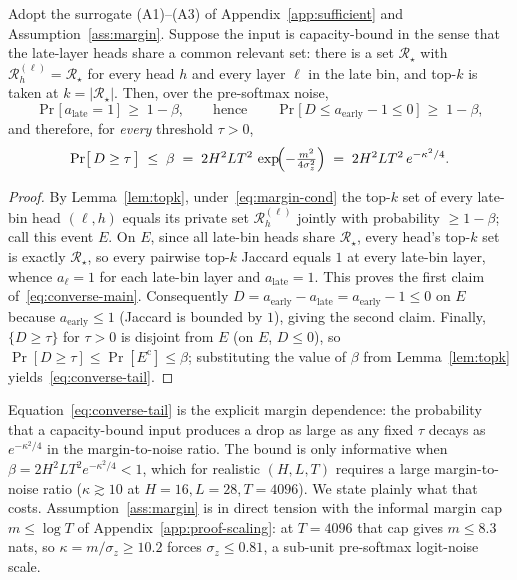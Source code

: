 \begin{theorem}
\label{thm:converse}
Adopt the surrogate (A1)--(A3) of Appendix~\ref{app:sufficient} and
Assumption~\ref{ass:margin}. Suppose the input is capacity-bound in the sense
that the late-layer heads share a common relevant set: there is a set
$\mathcal{R}_\star$ with $\mathcal{R}^{(\ell)}_h=\mathcal{R}_\star$ for every
head $h$ and every layer $\ell$ in the late bin, and top-$k$ is taken at
$k=|\mathcal{R}_\star|$. Then, over the pre-softmax noise,
\begin{equation}
\label{eq:converse-main}
\Pr\bigl[\,a_{\mathrm{late}} = 1\,\bigr]\;\ge\;1-\beta,
\qquad\text{hence}\qquad
\Pr\bigl[\,D \le a_{\mathrm{early}}-1 \le 0\,\bigr]\;\ge\;1-\beta,
\end{equation}
and therefore, for \emph{every} threshold $\tau>0$,
\begin{equation}
\label{eq:converse-tail}
\Pr\bigl[\,D \ge \tau\,\bigr]\;\le\;\beta
\;=\;2 H^2 L T^2\,\exp\!\Bigl(-\tfrac{m^2}{4\sigma_z^2}\Bigr)
\;=\;2 H^2 L T^2\,e^{-\kappa^2/4}.
\end{equation}
\end{theorem}

\begin{proof}
By Lemma~\ref{lem:topk}, under~\eqref{eq:margin-cond} the top-$k$ set of every
late-bin head $(\ell,h)$ equals its private set $\mathcal{R}^{(\ell)}_h$
jointly with probability $\ge1-\beta$; call this event $E$. On $E$, since all
late-bin heads share $\mathcal{R}_\star$, every head's top-$k$ set is exactly
$\mathcal{R}_\star$, so every pairwise top-$k$ Jaccard equals $1$ at every
late-bin layer, whence $a_\ell=1$ for each late-bin layer and
$a_{\mathrm{late}}=1$. This proves the first claim of~\eqref{eq:converse-main}.
Consequently $D=a_{\mathrm{early}}-a_{\mathrm{late}}=a_{\mathrm{early}}-1\le0$
on $E$ because $a_{\mathrm{early}}\le1$ (Jaccard is bounded by $1$), giving the
second claim. Finally, $\{D\ge\tau\}$ for $\tau>0$ is disjoint from $E$ (on $E$,
$D\le0$), so $\Pr[D\ge\tau]\le\Pr[E^{\mathrm c}]\le\beta$; substituting the
value of $\beta$ from Lemma~\ref{lem:topk} yields~\eqref{eq:converse-tail}.
\end{proof}

Equation~\eqref{eq:converse-tail} is the explicit margin dependence: the
probability that a capacity-bound input produces a drop as large as any fixed
$\tau$ decays as $e^{-\kappa^2/4}$ in the margin-to-noise ratio. The bound is
only informative when $\beta = 2H^2 L T^2 e^{-\kappa^2/4} < 1$, which for
realistic $(H, L, T)$ requires a large margin-to-noise ratio
($\kappa \gtrsim 10$ at $H{=}16, L{=}28, T{=}4096$). We state plainly what that
costs. Assumption~\ref{ass:margin} is in direct tension with the informal
margin cap $m \le \log T$ of Appendix~\ref{app:proof-scaling}: at $T = 4096$
that cap gives $m \le 8.3$ nats, so $\kappa = m/\sigma_z \ge 10.2$ forces
$\sigma_z \le 0.81$, a sub-unit pre-softmax logit-noise scale.

